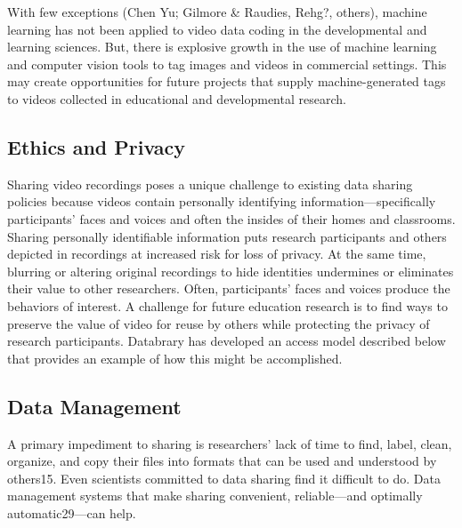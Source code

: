 \documentclass[letterpaper,man,apacite]{apa6}
\begin{document}
With few exceptions (Chen Yu; Gilmore \& Raudies, Rehg?, others), machine learning has not been applied to video data coding in the developmental and learning sciences.
But, there is explosive growth in the use of machine learning and computer vision tools to tag images and videos in commercial settings.
This may create opportunities for future projects that supply machine-generated tags to videos collected in educational and developmental research.

\subsection{Ethics and Privacy}

Sharing video recordings poses a unique challenge to existing data sharing policies because videos contain personally identifying information—specifically participants’ faces and voices and often the
insides of their homes and classrooms. 
Sharing personally identifiable information puts research participants and others depicted in recordings at increased risk for loss of privacy. 
At the same time, blurring or altering original recordings to hide identities undermines or eliminates
their value to other researchers. 
Often, participants’ faces and voices produce the behaviors of interest.
A challenge for future education research is to find ways to preserve the value of video for reuse by others while protecting the privacy of research participants.
Databrary has developed an access model described below that provides an example of how this might be accomplished.

\subsection{Data Management}
A primary impediment to sharing is researchers’ lack of time to find, label, clean, organize, and copy their files into formats that can be used and understood by others15. 
Even scientists committed to data sharing find it difficult to do. Data management systems that make sharing convenient, reliable—and optimally automatic29—can help.
\end{document}
